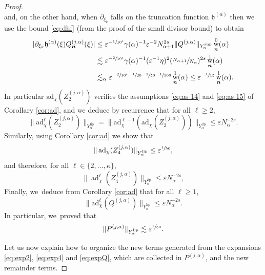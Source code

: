 \documentclass[JEP,XML,SOM,Unicode,published]{cedram}
\DeclareMathOperator{\rw}{w}
\theoremstyle{plain}
\theoremstyle{definition}
\newcommand{\nb}{{\boldsymbol n}}
\newcommand{\1}{\mathbf{1}}
\newcommand{\Ysup}[1]{Y_{#1}^{\mathrm{sup}}}
\newcommand{\Ylip}[1]{Y_{#1}^{\mathrm{lip}}}
\let\epsilon\varepsilon
\begin{document}
\begin{proof}
\[\]
and, on the other hand, when $\partial_{\xi_{k}}$ falls on the truncation function $\mathfrak{h}^{(\alpha)}$ then we use the bound \eqref{eq:dhf} (from the proof of the small divisor bound) to obtain
\begin{align*}
|\partial_{\xi_{k}}\mathfrak{h}^{(\alpha)}(\xi)Q^{(j,\alpha)}_{\nb}(\xi)|
&\leq
\epsilon^{-\sfrac{1}{10^{4}}}\gamma(\alpha)^{-1}\epsilon^{-2}N_{\alpha+1}^{2s}
\|Q^{(j,\alpha)}\|_{\Ysup{\alpha}}\rw_{\nb}^{0}(\alpha) \\
&\lesssim\epsilon^{-\sfrac{2}{10^{4}}}\gamma(\alpha)^{-1}
(\epsilon^{-1}\eta)^{2}
(\sfrac{N_{\alpha+1}}{N_{\alpha}})^{2s}
\rw_{\nb}^{1}(\alpha) \\
&\lesssim_{\alpha}
\epsilon^{-\sfrac{2}{10^{4}}-\sfrac{1}{30}-\sfrac{1}{50}-\sfrac{1}{100}} \rw_{\nb}^{1}(\alpha)
\leq
\epsilon^{-\sfrac{1}{15}}\rw_{\nb}^{1}(\alpha).
\end{align*}
In particular $\mathrm{ad}_{\chi}(Z_{2}^{(j,\alpha)})$ verifies the assumptions \eqref{eq:as-14} and \eqref{eq:as-15} of Corollary \ref{cor:ad}, and we deduce by recurrence that for all $\ell\geq2$,
\begin{equation}
\label{eq:adZ1}
\|\mathrm{ad}_{\chi}^{\ell}(Z_{2}^{(j,\alpha)})\|_{\Ylip{\alpha}}
=
\|
\mathrm{ad}_{\chi}^{\ell-1}(\mathrm{ad}_{\chi}(Z_{2}^{(j,\alpha)}))
\|_{\Ylip{\alpha}}
\leq
\epsilon N_{\alpha}^{-2s}.
\end{equation}
Similarly, using Corollary \ref{cor:ad} we show that
\[
\|\operatorname{ad}_{\chi}(Z_{4}^{(j,\alpha)})\|_{\Ylip{\alpha}} \leq \epsilon^{\sfrac{1}{50}},
\]
and therefore, for all $\ell\in\{2,\dots,\kappa\}$,
\begin{equation}
\label{eq:adZ41}
\|\operatorname{ad}_{\chi}^{\ell}(Z_{4}^{(j,\alpha)})\|_{\Ylip{\alpha}} \leq \epsilon N_{\alpha}^{-2s},
\end{equation}
Finally, we~deduce from Corollary \ref{cor:ad} that for all $\ell\geq1$,
\begin{equation}
\label{eq:adQ1}
\|\mathrm{ad}_{\chi}^{\ell}(Q^{(j,\alpha)})\|_{\Ylip{\alpha}}
\leq \epsilon N_{\alpha}^{-2s}.
\end{equation}
In particular, we~proved that
\begin{equation}
\label{eq:Ptilde1}
\|P^{(j,\alpha)}\|_{\Ylip{\alpha}}\lesssim \epsilon^{\sfrac{1}{50}}.
\end{equation}

Let us now explain how to organize the new terms generated from the expansions \eqref{eq:exp2}, \eqref{eq:exp4} and \eqref{eq:expQ}, which are collected in $P^{(j,\alpha)}$, and the new remainder terms.


\end{proof}
\end{document}

